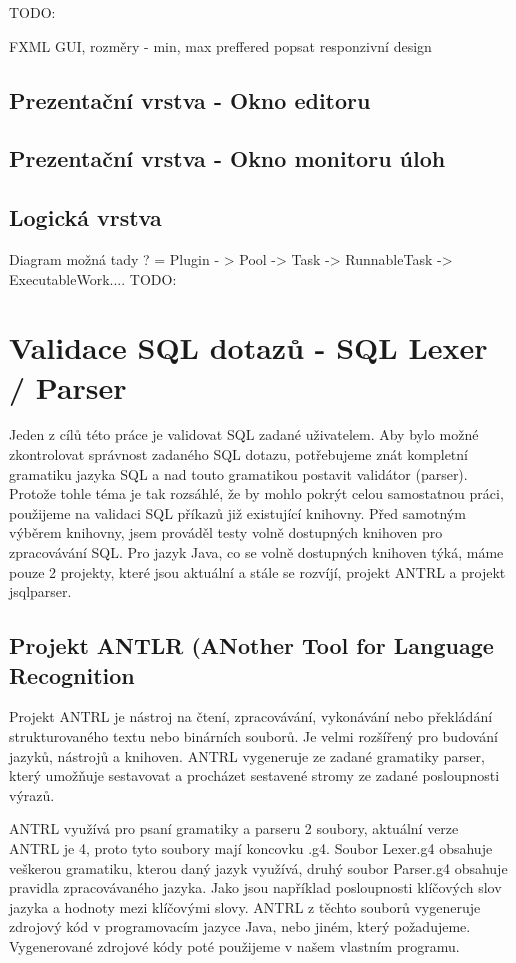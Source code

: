 \documentclass[czech,bachelor,public,dept460,male,cpdeclaration,twoside]{diploma}
\begin{document}
TODO:

FXML GUI, rozměry - min, max preffered popsat responzivní design
\subsection{Prezentační vrstva - Okno editoru}
\subsection{Prezentační vrstva - Okno monitoru úloh}


\subsection{Logická vrstva} \label{logic}
Diagram možná tady ? = Plugin - > Pool -> Task -> RunnableTask -> ExecutableWork.... TODO:


\section{Validace SQL dotazů - SQL Lexer / Parser}
Jeden z cílů této práce je validovat SQL zadané uživatelem. Aby bylo možné zkontrolovat správnost zadaného SQL dotazu, potřebujeme znát kompletní gramatiku jazyka SQL a nad touto gramatikou postavit validátor (parser). Protože tohle téma je tak rozsáhlé, že by mohlo pokrýt celou samostatnou práci, použijeme na validaci SQL příkazů již existující knihovny. Před samotným výběrem knihovny, jsem prováděl testy volně dostupných knihoven pro zpracovávání SQL. Pro jazyk Java, co se volně dostupných knihoven týká, máme pouze 2 projekty, které jsou aktuální a stále se rozvíjí, projekt ANTRL a projekt jsqlparser.


\subsection{Projekt ANTLR (ANother Tool for Language Recognition}
Projekt ANTRL je nástroj na čtení, zpracovávání, vykonávání nebo překládání strukturovaného textu nebo binárních souborů. Je velmi rozšířený pro budování jazyků, nástrojů a knihoven. ANTRL vygeneruje ze zadané gramatiky parser, který umožňuje sestavovat a procházet sestavené stromy ze zadané posloupnosti výrazů. \cite{antrl}



ANTRL využívá pro psaní gramatiky a parseru 2 soubory, aktuální verze ANTRL je 4, proto tyto soubory mají koncovku .g4. Soubor Lexer.g4 obsahuje veškerou gramatiku, kterou daný jazyk využívá, druhý soubor Parser.g4 obsahuje pravidla zpracovávaného jazyka. Jako jsou například posloupnosti klíčových slov jazyka a hodnoty mezi klíčovými slovy.
ANTRL z těchto souborů vygeneruje zdrojový kód v programovacím jazyce Java, nebo jiném, který požadujeme. Vygenerované zdrojové kódy poté použijeme v našem vlastním programu. \cite{antrldocs}
\end{document}
